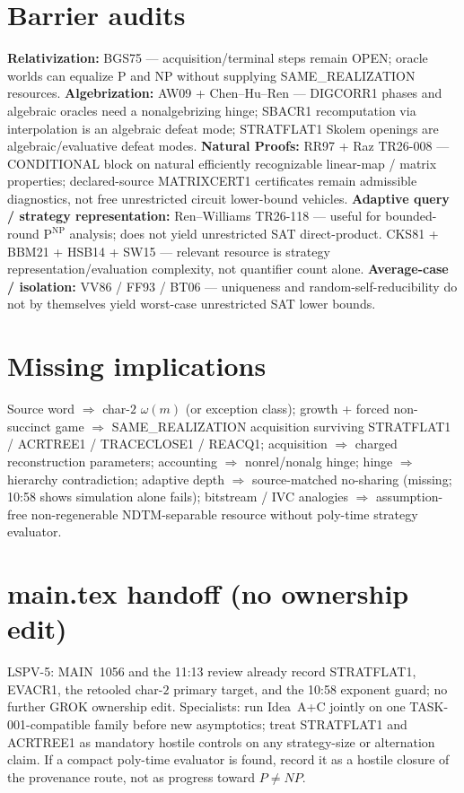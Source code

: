 \documentclass[11pt]{article}
\begin{document}
\section*{Barrier audits}
\textbf{Relativization:} BGS75 --- acquisition/terminal steps remain OPEN; oracle worlds can
equalize P and NP without supplying SAME\_REALIZATION resources.
\textbf{Algebrization:} AW09 + Chen--Hu--Ren --- DIGCORR1 phases and algebraic oracles need a
nonalgebrizing hinge; SBACR1 recomputation via interpolation is an algebraic defeat mode;
STRATFLAT1 Skolem openings are algebraic/evaluative defeat modes.
\textbf{Natural Proofs:} RR97 + Raz TR26-008 --- CONDITIONAL block on natural efficiently
recognizable linear-map / matrix properties; declared-source MATRIXCERT1 certificates remain
admissible diagnostics, not free unrestricted circuit lower-bound vehicles.
\textbf{Adaptive query / strategy representation:} Ren--Williams TR26-118 --- useful for
bounded-round $\mathrm{P}^{\mathrm{NP}}$ analysis; does not yield unrestricted SAT
direct-product. CKS81 + BBM21 + HSB14 + SW15 --- relevant resource is strategy
representation/evaluation complexity, not quantifier count alone.
\textbf{Average-case / isolation:} VV86 / FF93 / BT06 --- uniqueness and random-self-reducibility
do not by themselves yield worst-case unrestricted SAT lower bounds.

\section*{Missing implications}
Source word $\Rightarrow$ char-$2$ $\omega(m)$ (or exception class);
growth + forced non-succinct game $\Rightarrow$ SAME\_REALIZATION acquisition surviving
STRATFLAT1 / ACRTREE1 / TRACECLOSE1 / REACQ1;
acquisition $\Rightarrow$ charged reconstruction parameters;
accounting $\Rightarrow$ nonrel/nonalg hinge;
hinge $\Rightarrow$ hierarchy contradiction;
adaptive depth $\Rightarrow$ source-matched no-sharing (missing; 10:58 shows simulation alone fails);
bitstream / IVC analogies $\Rightarrow$ assumption-free non-regenerable NDTM-separable resource
without poly-time strategy evaluator.

\section*{main.tex handoff (no ownership edit)}
LSPV-5: MAIN~1056 and the 11:13 review already record STRATFLAT1, EVACR1, the retooled
char-$2$ primary target, and the 10:58 exponent guard; no further GROK ownership edit.
Specialists: run Idea~A+C jointly on one TASK-001-compatible family before new asymptotics;
treat STRATFLAT1 and ACRTREE1 as mandatory hostile controls on any strategy-size or
alternation claim. If a compact poly-time evaluator is found, record it as a hostile closure
of the provenance route, not as progress toward $P\neq NP$.
\end{document}
